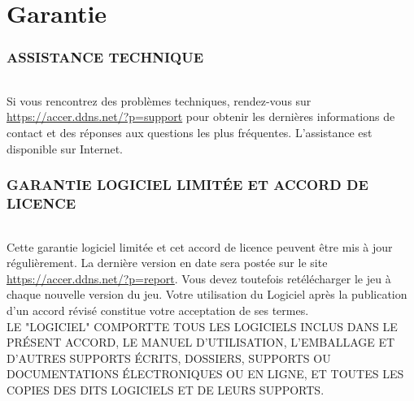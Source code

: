 \documentclass[titlepage, 13px, a4paper]{report}
\begin{document}
\AddToShipoutPicture*{\BackgroundPic}

\maketitle
\tableofcontents


\part{Garantie} 

\section*{ASSISTANCE TECHNIQUE}
\paragraph*{} \hspace{0pt}
Si vous rencontrez des problèmes techniques, rendez-vous sur 
\url{https://accer.ddns.net/?p=support} pour obtenir les dernières informations de 
contact et des réponses aux questions les plus fréquentes. L'assistance est
disponible sur Internet. \\

\section*{GARANTIE LOGICIEL LIMITÉE ET ACCORD DE LICENCE}
\paragraph*{} \hspace{0pt}
Cette garantie logiciel limitée et cet accord de licence peuvent être mis à
jour régulièrement. La dernière version en date sera postée sur le site 
\url{https://accer.ddns.net/?p=report}. Vous devez toutefois retélécharger le 
jeu à chaque nouvelle version du jeu. Votre utilisation du Logiciel après la
publication d'un accord révisé constitue votre acceptation de ses termes. \\

LE "LOGICIEL" COMPORTTE TOUS LES LOGICIELS INCLUS DANS LE PRÉSENT ACCORD, LE 
MANUEL D'UTILISATION, L'EMBALLAGE ET D'AUTRES SUPPORTS ÉCRITS, DOSSIERS,
SUPPORTS OU DOCUMENTATIONS ÉLECTRONIQUES OU EN LIGNE, ET TOUTES LES COPIES
DES DITS LOGICIELS ET DE LEURS SUPPORTS. \\
\end{document}
